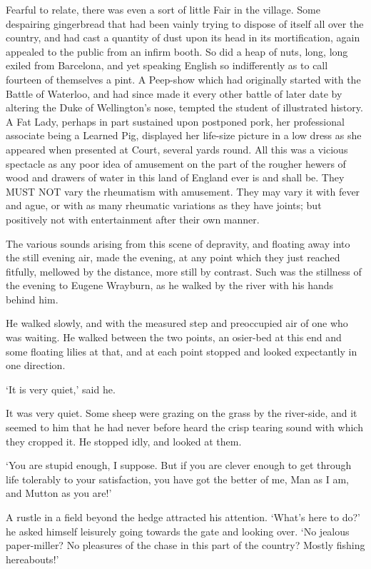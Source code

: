 Fearful to relate, there was even a sort of little Fair in the village.
Some despairing gingerbread that had been vainly trying to dispose of
itself all over the country, and had cast a quantity of dust upon its
head in its mortification, again appealed to the public from an infirm
booth. So did a heap of nuts, long, long exiled from Barcelona, and yet
speaking English so indifferently as to call fourteen of themselves
a pint. A Peep-show which had originally started with the Battle of
Waterloo, and had since made it every other battle of later date
by altering the Duke of Wellington’s nose, tempted the student of
illustrated history. A Fat Lady, perhaps in part sustained upon
postponed pork, her professional associate being a Learned Pig,
displayed her life-size picture in a low dress as she appeared when
presented at Court, several yards round. All this was a vicious
spectacle as any poor idea of amusement on the part of the rougher
hewers of wood and drawers of water in this land of England ever is and
shall be. They MUST NOT vary the rheumatism with amusement. They may
vary it with fever and ague, or with as many rheumatic variations as
they have joints; but positively not with entertainment after their own
manner.

The various sounds arising from this scene of depravity, and floating
away into the still evening air, made the evening, at any point which
they just reached fitfully, mellowed by the distance, more still by
contrast. Such was the stillness of the evening to Eugene Wrayburn, as
he walked by the river with his hands behind him.

He walked slowly, and with the measured step and preoccupied air of one
who was waiting. He walked between the two points, an osier-bed at this
end and some floating lilies at that, and at each point stopped and
looked expectantly in one direction.

‘It is very quiet,’ said he.

It was very quiet. Some sheep were grazing on the grass by the
river-side, and it seemed to him that he had never before heard the
crisp tearing sound with which they cropped it. He stopped idly, and
looked at them.

‘You are stupid enough, I suppose. But if you are clever enough to get
through life tolerably to your satisfaction, you have got the better of
me, Man as I am, and Mutton as you are!’

A rustle in a field beyond the hedge attracted his attention. ‘What’s
here to do?’ he asked himself leisurely going towards the gate and
looking over. ‘No jealous paper-miller? No pleasures of the chase in
this part of the country? Mostly fishing hereabouts!’

